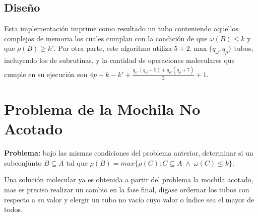 \documentclass[12pt, letterpaper, twoside]{article}
\begin{document}
    \begin{algorithm}
        \begin{algorithmic}[1]
            \EndFor
            \EndFor
            \EndProcedure
        \end{algorithmic}
    \end{algorithm}
    \subsection{Diseño}

    Esta implementación imprime como resultado un tubo conteniendo aquellos complejos de memoria los cuales cumplan con la condición de que $\omega(B)\leq{k}$ y que $\rho(B)\geq{k'}$. Por otra parte, este algoritmo utiliza $5 + 2 . \max{\{q_\omega, q_\rho\}}$ tubos, incluyendo los de subrutinas, y la cantidad de operaciones moleculares que cumple en su ejecución son $4p+k-k'+\frac{q_\omega.(q_\omega+5)+q_\rho.(q_\rho+7)}{2}+1$.

    \newpage
    \section{Problema de la Mochila No Acotado}
    \textbf{Problema:} bajo las mismas condiciones del problema anterior, determinar si un subconjunto $B\subseteq A$ tal que $\rho(B) =max\{\rho(C):C\subseteq A\;\land\;\omega(C) \leq k\}$.


    Una solución molecular ya es obtenida a partir del problema la mochila acotado, mas es preciso realizar un cambio en la fase final, dígase ordernar los tubos con respecto a su valor y  elergir un tubo no vacío cuyo valor o índice sea el mayor de todos.
\end{document}
